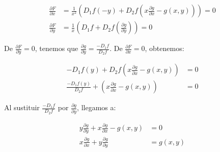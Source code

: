 \documentclass{report}
\begin{document}
\begin{align*}
\frac{\partial F}{\partial x} &= \frac{1}{x^2}\left(D_1 f(-y)+D_2 f\left(x \frac{\partial g}{\partial x}-g(x, y)\right)\right) = 0 \\
\frac{\partial F}{\partial y} &= \frac{1}{x}\left(D_1 f+D_2 f\left(\frac{\partial g}{\partial y}\right)\right) = 0
\end{align*}

De $\frac{\partial F}{\partial y}=0$, tenemos que $\frac{\partial g}{\partial y} = \frac{-D_1 f}{D_2 f}$. De $\frac{\partial F}{\partial x}=0$, obtenemos:

\begin{align*}
-D_1 f(y)+D_2 f\left(x \frac{\partial g}{\partial x}-g(x, y)\right) &= 0 \\
\frac{-D_1 f(y)}{D_2 f}+\left(x \frac{\partial g}{\partial x}-g(x, y)\right) &= 0
\end{align*}

Al sustituir $\frac{-D_1 f}{D_2 f}$ por $\frac{\partial g}{\partial y}$, llegamos a:

\begin{align*}
y \frac{\partial g}{\partial y}+x \frac{\partial g}{\partial x}-g(x, y) &= 0 \\
x \frac{\partial g}{\partial x}+y \frac{\partial g}{\partial y} &= g(x, y)
\end{align*}
\end{document}
